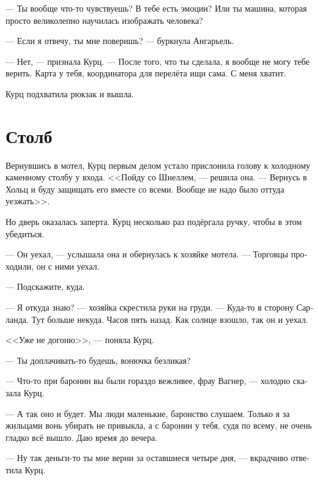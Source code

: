 \documentclass[a4paper,12pt,fleqn]{book}\usepackage{polyglossia}\setdefaultlanguage[babelshorthands=true]{russian}\setotherlanguage{english}\defaultfontfeatures{Ligatures=TeX,Mapping=tex-text}\usepackage{xcolor}\newcommand{\ml}[3]{#2}
\begin{document}
--- Ты вообще что-то чувствуешь?
В тебе есть эмоции?
Или ты машина, которая просто великолепно научилась изображать человека?

--- Если я отвечу, ты мне поверишь? --- буркнула Ангарьель.

\ml{$0$}
{--- Нет, --- признала Курц.}
{``No,'' Kurz admitted.}
\ml{$0$}
{--- После того, что ты сделала, я вообще не могу тебе верить.}
{``After what you've done, I can't trust you, ever.}
\ml{$0$}
{Карта у тебя, координатора для перелёта ищи сама.}
{You have your map, you look for a flight leader for yourself.}
\ml{$0$}
{С меня хватит.}
{I'm done.''}

Курц подхватила рюкзак и вышла.

\section{Столб}

Вернувшись в мотел, Курц первым делом устало прислонила голову к холодному каменному столбу у входа.
<<Пойду со Шнеллем, --- решила она.
--- Вернусь в Хольц и буду защищать его вместе со всеми.
Вообще не надо было оттуда уезжать>>.

Но дверь оказалась заперта.
Курц несколько раз подёргала ручку, чтобы в этом убедиться.

--- Он уехал, --- услышала она и обернулась к хозяйке мотела.
--- Торговцы проходили, он с ними уехал.

--- Подскажите, куда.

--- Я откуда знаю? --- хозяйка скрестила руки на груди.
--- Куда-то в сторону Сарланда.
Тут больше некуда.
Часов пять назад.
Как солнце взошло, так он и уехал.

<<Уже не догоню>>, --- поняла Курц.

\ml{$0$}
{--- Ты доплачивать-то будешь, вонючка безликая?}
{``Gonna pay extra, faceless stink?''}

\ml{$0$}
{--- Что-то при баронин вы были гораздо вежливее, фрау Вагнер, --- холодно сказала Курц.}
{``You were much more polite in front of Baronin, frau Wagner,'' Kurz coldly said.}

\ml{$0$}
{--- А так оно и будет.}
{``And that's the way we go.}
\ml{$0$}
{Мы люди маленькие, баронство слушаем.}
{We're humble people, we obey Baronstitel.}
Только я за жильцами вонь убирать не привыкла, а с баронин у тебя, судя по всему, не очень гладко всё вышло.
\ml{$0$}
{Даю время до вечера.}
{You have time till the evening.''}

--- Ну так деньги-то ты мне верни за оставшиеся четыре дня, --- вкрадчиво ответила Курц.
\end{document}
